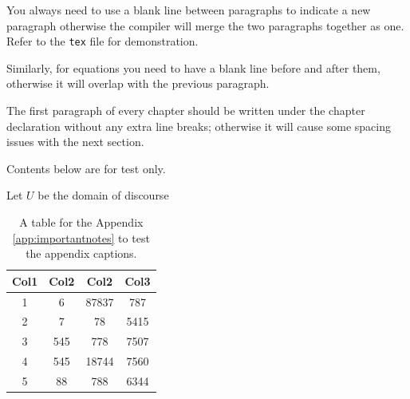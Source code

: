 \documentclass[a4paper,12pt,oneside]{report}
\begin{document}





\begin{appendices}


You always need to use a blank line between paragraphs to indicate a new paragraph otherwise the compiler will merge the two paragraphs together as one. Refer to the \texttt{tex} file for demonstration.

Similarly, for equations you need to have a blank line before and after them, otherwise it will overlap with the previous paragraph.

The first paragraph of every chapter should be written under the chapter declaration without any extra line breaks; otherwise it will cause some spacing issues with the next section.

Contents below are for test only.

\begin{definition}[]
Let $U$ be the domain of discourse 
\end{definition}

\begin{table}[htb] %
\caption{\centering A table for the Appendix \ref{app:importantnotes} to test the appendix captions.}
\label{table:3}
\centering
\begin{tabular}{|c c c c|} 
 \hline
 Col1 & Col2 & Col2 & Col3 \\ [0.5ex] 
 \hline\hline
 1 & 6 & 87837 & 787 \\ 
 2 & 7 & 78 & 5415 \\
 3 & 545 & 778 & 7507 \\
 4 & 545 & 18744 & 7560 \\
 5 & 88 & 788 & 6344 \\ [1ex] 
 \hline
\end{tabular}
\end{table}


\end{appendices}
\end{document}
